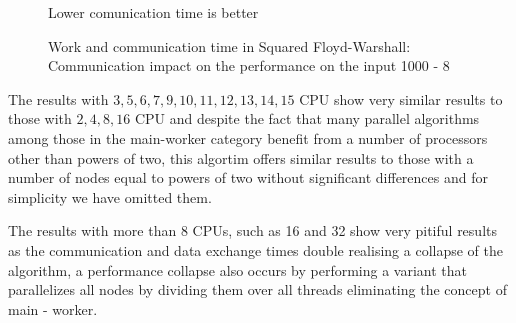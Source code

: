 \begin{figure}[htbp]
    \datatable
        
        \caption*{Lower comunication time is better}

    \caption{Work and communication time in Squared Floyd-Warshall: Communication impact on the performance on the input 1000 - 8}
    \label{work-and-communication-time}
\end{figure}


The results with \(3,5,6,7,9,10,11,12,13,14,15\) CPU show very similar results to those with \(2,4,8,16\) CPU and despite the fact that many parallel algorithms among those in the main-worker category benefit from a number of processors other than powers of two, this algortim offers similar results to those with a number of nodes equal to powers of two without significant differences and for simplicity we have omitted them.

The results with more than 8 CPUs, such as 16 and 32 show very pitiful results as the communication and data exchange times double realising a collapse of the algorithm, a performance collapse also occurs by performing a variant that parallelizes all nodes by dividing them over all threads eliminating the concept of main - worker.

